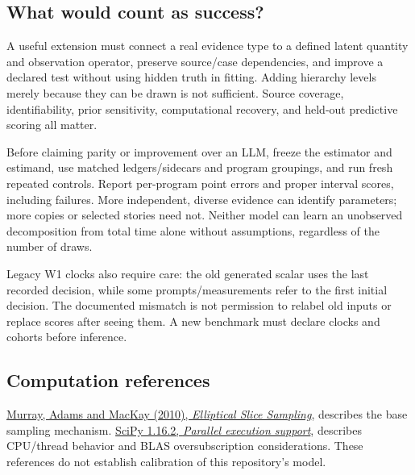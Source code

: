 \documentclass[10pt]{article}
\begin{document}
\subsection*{What would count as success?}
A useful extension must connect a real evidence type to a defined latent quantity
and observation operator, preserve source/case dependencies, and improve a declared
test without using hidden truth in fitting. Adding hierarchy levels merely because
they can be drawn is not sufficient. Source coverage, identifiability, prior
sensitivity, computational recovery, and held-out predictive scoring all matter.

Before claiming parity or improvement over an LLM, freeze the estimator and
estimand, use matched ledgers/sidecars and program groupings, and run fresh repeated
controls. Report per-program point errors and proper interval scores, including
failures. More independent, diverse evidence can identify parameters; more copies
or selected stories need not. Neither model can learn an unobserved decomposition
from total time alone without assumptions, regardless of the number of draws.

Legacy W1 clocks also require care: the old generated scalar uses the last
recorded decision, while some prompts/measurements refer to the first initial
decision. The documented mismatch is not permission to relabel old inputs or
replace scores after seeing them. A new benchmark must declare clocks and cohorts
before inference.

\subsection*{Computation references}
\href{https://proceedings.mlr.press/v9/murray10a.html}{Murray, Adams and MacKay
(2010), \emph{Elliptical Slice Sampling}}, describes the base sampling mechanism.
\href{https://docs.scipy.org/doc/scipy-1.16.2/tutorial/parallel_execution.html}{SciPy
1.16.2, \emph{Parallel execution support}}, describes CPU/thread behavior and
BLAS oversubscription considerations. These references do not establish calibration
of this repository's model.
\end{document}
